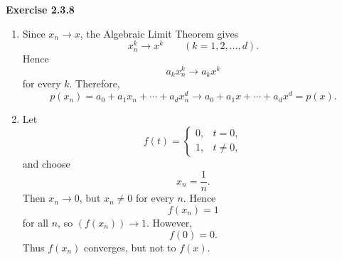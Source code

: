 \documentclass[12pt]{article}
\begin{document}
\noindent{}\textbf{Exercise 2.3.8}
\begin{enumerate}
    \item [(a)]
          Since \(x_n\to x\), the Algebraic Limit Theorem gives
          \[
              x_n^k \to x^k
              \qquad (k=1,2,\ldots,d).
          \]
          Hence
          \[
              a_kx_n^k\to a_kx^k
          \]
          for every \(k\).
          Therefore,
          \[
              p(x_n)
              =
              a_0+a_1x_n+\cdots+a_dx_n^d
              \to
              a_0+a_1x+\cdots+a_dx^d
              =
              p(x).
          \]
    \item [(b)]
          Let
          \[
              f(t)=
              \begin{cases}
                  0, & t=0,    \\
                  1, & t\ne 0,
              \end{cases}
          \]and choose
          \[
              x_n=\frac1n.
          \]Then \(x_n\to0\), but \(x_n\ne0\) for every \(n\). Hence
          \[
              f(x_n)=1
          \]for all \(n\), so \((f(x_n))\to1\). However,
          \[
              f(0)=0.
          \]Thus \(f(x_n)\) converges, but not to \(f(x)\).
\end{enumerate}
\end{document}
